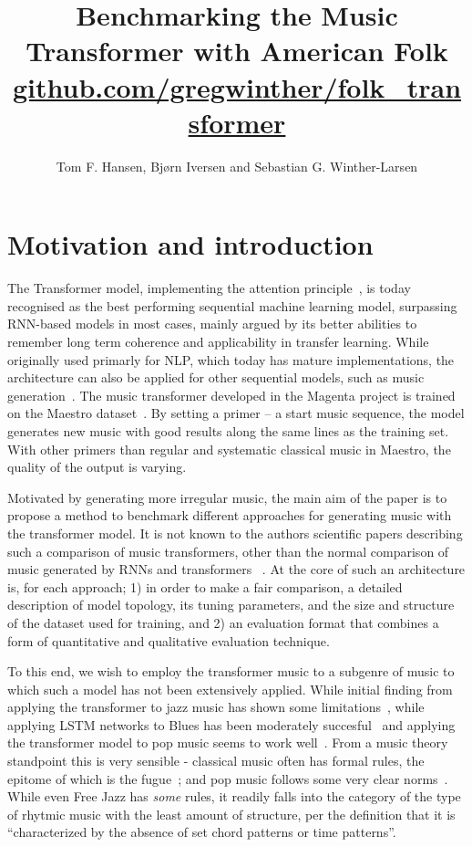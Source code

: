 \documentclass{article}
\title{Benchmarking the Music Transformer with American Folk \\
    \normalsize{\url{github.com/gregwinther/folk_transformer}}}
\author{Tom F. Hansen, Bjørn Iversen and Sebastian G. Winther-Larsen}
\begin{document}
    \maketitle

    \section{Motivation and introduction}

        The Transformer model, implementing the attention principle~\cite{vaswani2017attention},
        is today recognised as the best performing sequential machine learning model,
        surpassing RNN-based models in most cases, mainly argued by its better abilities
        to remember long term coherence and applicability in transfer learning.
        While originally used primarly for NLP, which today has mature implementations,
        the architecture can also be applied for other sequential models,
        such as music generation~\cite{huang2018music}.
        The music transformer developed in the Magenta project is trained on the Maestro
        dataset~\cite{maestrodataset}.
        By setting a primer – a start music sequence, the model generates new music with good
        results along the same lines as the training set. With other primers than regular and
        systematic classical music in Maestro, the quality of the output is varying.
        
        Motivated by generating more irregular music, the main aim of the paper is
        to propose a method to benchmark different approaches for generating music
        with the transformer model. It is not known to the authors scientific papers
        describing such a comparison of music transformers, other than the normal
        comparison of music generated by RNNs and transformers ~\cite{huang2018music}.
        At the core
        of such an architecture is, for each approach; 1) in order to make a fair comparison,
        a detailed description of model topology, its tuning parameters, and the size
        and structure of the dataset used for training, and 2) an evaluation format
        that combines a form of quantitative and qualitative evaluation technique.
       
        To this end, we wish to employ the transformer music to a subgenre of music 
        to which such a model has not been extensively applied.
        While initial finding from applying the transformer to jazz music has shown 
        some limitations~\cite{wu2020jazz}, while applying LSTM networks to Blues has 
        been moderately succesful~\cite{eck2002bluesLSTM} and applying the transformer 
        model to pop music seems to work well~\cite{huang2020pop}.
        From a music theory standpoint this is very sensible - classical music often has 
        formal rules, the epitome of which is the fugue~\cite{giraud2015computational};
        and pop music follows some very clear norms~\cite{hennion1983production}. While 
        even Free Jazz has \emph{some} rules, it readily falls into the category of the 
        type of rhytmic music with the least amount of structure, per the definition
        that it is ``characterized by the absence of set chord patterns or
        time patterns''\cite{FreeJazz}.
\end{document}
